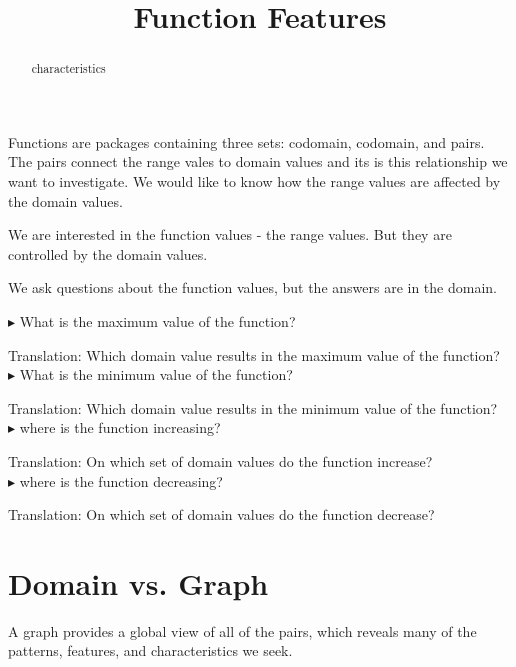 \documentclass{ximera}
\title{Function Features}
\begin{document}
\begin{abstract}
characteristics
\end{abstract}
\maketitle





Functions are packages containing three sets: codomain, codomain, and pairs.  The pairs connect the range vales to domain values and its is this relationship we want to investigate.   We would like to know how the range values are affected by the domain values. 

We are interested in the function values - the range values.  But they are controlled by the domain values.

We ask questions about the function values, but the answers are in the domain.







$\blacktriangleright$ What is the maximum value of the function? 

Translation: Which domain value results in the maximum value of the function? \\


$\blacktriangleright$ What is the minimum value of the function? 

Translation: Which domain value results in the minimum value of the function? \\


$\blacktriangleright$ where is the function increasing? 

Translation: On which set of domain values do the function increase? \\


$\blacktriangleright$ where is the function decreasing? 

Translation: On which set of domain values do the function decrease? \\







\section{Domain vs. Graph}



A graph provides a global view of all of the pairs, which reveals many of the patterns, features, and characteristics we seek.   
\end{document}
